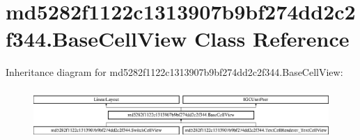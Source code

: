 \hypertarget{classmd5282f1122c1313907b9bf274dd2c2f344_1_1BaseCellView}{}\section{md5282f1122c1313907b9bf274dd2c2f344.\+Base\+Cell\+View Class Reference}
\label{classmd5282f1122c1313907b9bf274dd2c2f344_1_1BaseCellView}
Inheritance diagram for md5282f1122c1313907b9bf274dd2c2f344.\+Base\+Cell\+View\+:\begin{figure}[H]
\begin{center}
\leavevmode
\includegraphics[height=1.909091cm]{classmd5282f1122c1313907b9bf274dd2c2f344_1_1BaseCellView}
\end{center}
\end{figure}
